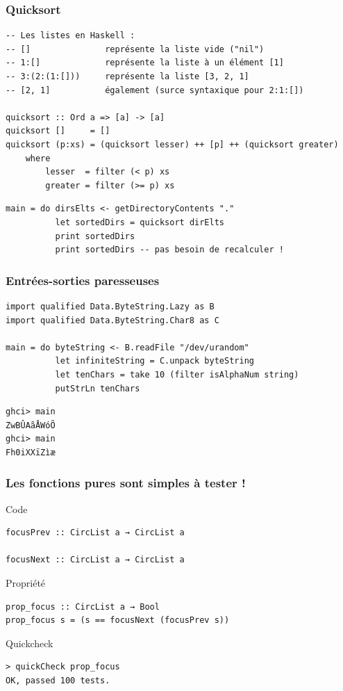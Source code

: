 \documentclass[10pt]{beamer}
\begin{document}
\begin{frame}[fragile]
\frametitle{Quicksort}

\begin{verbatim}
-- Les listes en Haskell :
-- []               représente la liste vide ("nil")
-- 1:[]             représente la liste à un élément [1]
-- 3:(2:(1:[]))     représente la liste [3, 2, 1]
-- [2, 1]           également (surce syntaxique pour 2:1:[])

quicksort :: Ord a => [a] -> [a]
quicksort []     = []
quicksort (p:xs) = (quicksort lesser) ++ [p] ++ (quicksort greater)
    where
        lesser  = filter (< p) xs
        greater = filter (>= p) xs
\end{verbatim}

\pause

\begin{verbatim}
main = do dirsElts <- getDirectoryContents "."
          let sortedDirs = quicksort dirElts
          print sortedDirs
          print sortedDirs -- pas besoin de recalculer !
\end{verbatim}

\end{frame}



\begin{frame}[fragile]
\frametitle{Entrées-sorties paresseuses}
\begin{verbatim}
import qualified Data.ByteString.Lazy as B
import qualified Data.ByteString.Char8 as C

main = do byteString <- B.readFile "/dev/urandom"
          let infiniteString = C.unpack byteString
          let tenChars = take 10 (filter isAlphaNum string)
          putStrLn tenChars
\end{verbatim}

\begin{verbatim}
ghci> main
ZwBÛAãÅWóÕ
ghci> main
Fh0iXXïZìæ
\end{verbatim}
\end{frame}



\begin{frame}[fragile]
\frametitle{Les fonctions pures sont simples à tester !}
\begin{block}{Code}
\begin{verbatim}
focusPrev :: CircList a → CircList a

focusNext :: CircList a → CircList a
\end{verbatim}
\end{block}
\pause
\begin{block}{Propriété}
\begin{verbatim}
prop_focus :: CircList a → Bool
prop_focus s = (s == focusNext (focusPrev s))
\end{verbatim}
\end{block}
\pause
\begin{block}{Quickcheck}
\begin{verbatim}
> quickCheck prop_focus
OK, passed 100 tests.
\end{verbatim}
\end{block}
\end{frame}
\end{document}
